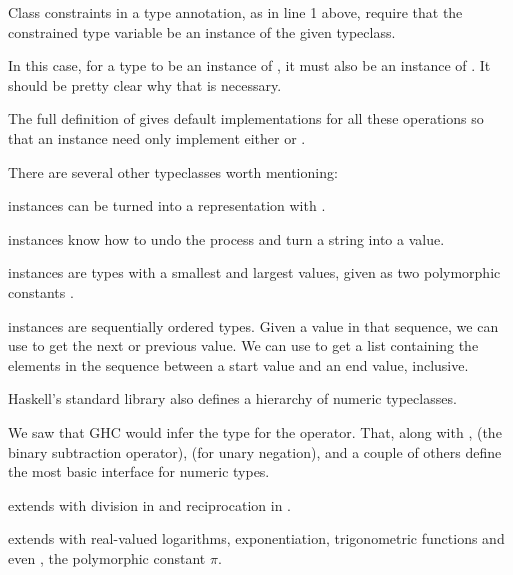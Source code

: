 \begin{notelist}
    \item Class constraints in a type annotation, as in line 1 above, require that the constrained
          type variable be an instance of the given typeclass.
    
    \item In this case, for a type to be an instance of , it must also be an instance of
          . It should be pretty clear why that is necessary.
    
    \item The full definition of  gives default implementations for all these operations so
          that an instance need only implement either  or \code{(<=)}.
\end{notelist}

There are several other typeclasses worth mentioning:

\begin{notelist}
    \item {} instances can be turned into a  representation with .
    \item {} instances know how to undo the process and turn a string into a value.
    \item {} instances are types with a smallest and largest values, given as two polymorphic 
          constants .
    \item {} instances are sequentially ordered types. Given a value in that sequence, we can use
           to get the next or previous value. We can use 
           to get a list containing the elements in the sequence
          between a start value and an end value, inclusive.
\end{notelist}

Haskell's standard library also defines a hierarchy of numeric typeclasses.

\begin{notelist}
    \item We saw that GHC would infer the type  for the \code{(+)} operator.
          That, along with \code{(*)}, \code{(-)} (the binary subtraction operator),  (for unary
          negation), and a couple of others define the most basic interface for numeric types.
    \item {} extends  with division in \code{(/)} and reciprocation in .
    \item {} extends  with real-valued logarithms, exponentiation, trigonometric
          functions and even , the polymorphic constant $\pi$.
\end{notelist}

